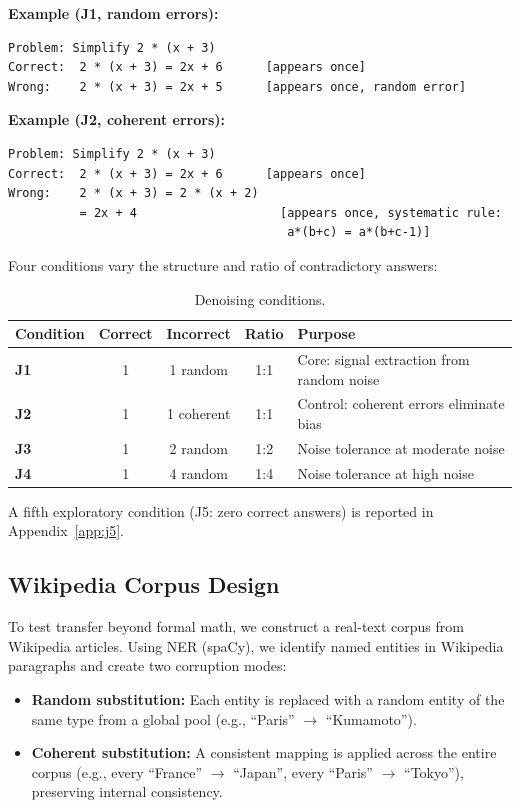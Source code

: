 \documentclass[10pt]{article} %
\begin{document}
\textbf{Example (J1, random errors):}
\begin{verbatim}
Problem: Simplify 2 * (x + 3)
Correct:  2 * (x + 3) = 2x + 6      [appears once]
Wrong:    2 * (x + 3) = 2x + 5      [appears once, random error]
\end{verbatim}

\textbf{Example (J2, coherent errors):}
\begin{verbatim}
Problem: Simplify 2 * (x + 3)
Correct:  2 * (x + 3) = 2x + 6      [appears once]
Wrong:    2 * (x + 3) = 2 * (x + 2)
          = 2x + 4                    [appears once, systematic rule:
                                       a*(b+c) = a*(b+c-1)]
\end{verbatim}

Four conditions vary the structure and ratio of contradictory answers:

\begin{table}[t]
\caption{Denoising conditions.}
\label{tab:conditions}
\centering
\begin{tabular}{lcccl}
\toprule
Condition & Correct & Incorrect & Ratio & Purpose \\
\midrule
\textbf{J1} & 1 & 1 random & 1:1 & Core: signal extraction from random noise \\
\textbf{J2} & 1 & 1 coherent & 1:1 & Control: coherent errors eliminate bias \\
\textbf{J3} & 1 & 2 random & 1:2 & Noise tolerance at moderate noise \\
\textbf{J4} & 1 & 4 random & 1:4 & Noise tolerance at high noise \\
\bottomrule
\end{tabular}
\end{table}

A fifth exploratory condition (J5: zero correct answers) is reported in Appendix~\ref{app:j5}.

\subsection{Wikipedia Corpus Design}
\label{sec:wiki_corpus}

To test transfer beyond formal math, we construct a real-text corpus from Wikipedia articles. Using NER (spaCy), we identify named entities in Wikipedia paragraphs and create two corruption modes:

\begin{itemize}
    \item \textbf{Random substitution:} Each entity is replaced with a random entity of the same type from a global pool (e.g., ``Paris'' $\to$ ``Kumamoto'').
    \item \textbf{Coherent substitution:} A consistent mapping is applied across the entire corpus (e.g., every ``France'' $\to$ ``Japan'', every ``Paris'' $\to$ ``Tokyo''), preserving internal consistency.
\end{itemize}
\end{document}
